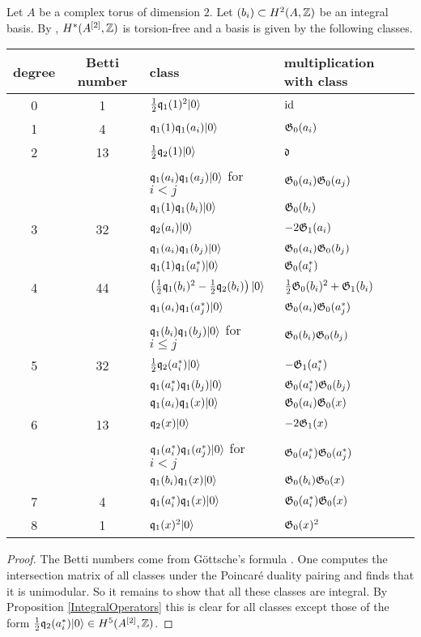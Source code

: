 \begin{proposition} \label{A2Basis}
 Let $A$ be a complex torus of dimension $2$. Let $(b_i)\subset H^2(A,\mathbb{Z})$ be an integral basis. By \cite{Totaro}, $H^*(A^{[2]},\mathbb{Z})$ is torsion-free and a basis is given by the following classes.
\begin{center}
\begin{tabular}{c|c|l|l}
 degree & Betti number & class & multiplication with class \\\hline
 0 & 1 & $\frac{1}{2}\mathfrak{q}_1(1)^2|0\rangle$ & $\operatorname{id}$ \\ \hline
 1 & 4 &  $\mathfrak{q}_1(1)\mathfrak{q}_1(a_i)|0\rangle$ & $\mathfrak{G}_0(a_i)$ \\ \hline
 2 & 13 & $\frac{1}{2}\mathfrak{q}_2(1)|0\rangle$ & $\mathfrak{d}$ \\ 
   &  & $\mathfrak{q}_1(a_i)\mathfrak{q}_1(a_j)|0\rangle$ for $i<j$ & $\mathfrak{G}_0(a_i)\mathfrak{G}_0(a_j)$ \\
   &  & $\mathfrak{q}_1(1)\mathfrak{q}_1(b_i)|0\rangle$ & $\mathfrak{G}_0(b_i)$ \\\hline
 3 & 32 & $\mathfrak{q}_2(a_i)|0\rangle$  & $-2\mathfrak{G}_1(a_i) $ \\
   &  & $\mathfrak{q}_1(a_i)\mathfrak{q}_1(b_j)|0\rangle$ & $\mathfrak{G}_0(a_i)\mathfrak{G}_0(b_j)$ \\ 
   &  & $\mathfrak{q}_1(1)\mathfrak{q}_1(a^*_i)|0\rangle$ & $\mathfrak{G}_0(a^*_i)$ \\\hline
 4 & 44 & $\left(\frac{1}{2}\mathfrak{q}_1(b_i)^2-\frac{1}{2}\mathfrak{q}_2(b_i)\right)|0\rangle$ & $\frac{1}{2} \mathfrak{G}_0(b_i)^2 + \mathfrak{G}_1(b_i) $ \\
   &  & $\mathfrak{q}_1(a_i)\mathfrak{q}_1(a^*_j)|0\rangle$ & $\mathfrak{G}_0(a_i)\mathfrak{G}_0(a^*_j)$ \\
   &  & $ \mathfrak{q}_1(b_i)\mathfrak{q}_1(b_j)|0\rangle$ for $i\leq j$ &  $\mathfrak{G}_0(b_i)\mathfrak{G}_0(b_j)$ \\\hline
 5 & 32 & $\frac{1}{2}\mathfrak{q}_2(a^*_i)|0\rangle$ & $-\mathfrak{G}_1(a^*_i)$ \\
   &  & $\mathfrak{q}_1(a^*_i)\mathfrak{q}_1(b_j)|0\rangle$ & $ \mathfrak{G}_0(a^*_i)\mathfrak{G}_0(b_j)$ \\
   &  & $\mathfrak{q}_1(a_i)\mathfrak{q}_1(x)|0\rangle$ & $\mathfrak{G}_0(a_i)\mathfrak{G}_0(x)$ \\\hline
 6 & 13 & $\mathfrak{q}_2(x)|0\rangle$ & $-2\mathfrak{G}_1(x)$ \\
   &  & $\mathfrak{q}_1(a^*_i)\mathfrak{q}_1(a^*_j)|0\rangle$ for $i<j$ & $\mathfrak{G}_0(a^*_i)\mathfrak{G}_0(a^*_j)$ \\
   &  & $\mathfrak{q}_1(b_i)\mathfrak{q}_1(x)|0\rangle$ & $ \mathfrak{G}_0(b_i)\mathfrak{G}_0(x)$ \\\hline
 7 & 4 & $\mathfrak{q}_1(a^*_i)\mathfrak{q}_1(x)|0\rangle$ & $\mathfrak{G}_0(a^*_i)\mathfrak{G}_0(x) $ \\\hline
 8 & 1 & $\mathfrak{q}_1(x)^2|0\rangle$ & $\mathfrak{G}_0(x)^2$ 
\end{tabular}
\end{center}
\begin{proof}
The Betti numbers come from G\"ottsche's formula \cite{Gottsche}.
One computes the intersection matrix of all classes under the Poincar\'e duality pairing and finds that it is unimodular. 
So it remains to show that all these classes are integral. By Proposition \ref{IntegralOperators} this is clear for all classes except 
those of the form $\frac{1}{2}\mathfrak{q}_2(a^*_i)|0\rangle \in H^5(A^{[2]},\mathbb{Z})$.


\end{proof}
\end{proposition}
